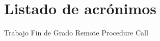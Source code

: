 \chapter{Listado de acrónimos}

\begin{acronym}[XXXXXXXX]
       {Trabajo Fin de Grado}
       {Remote Procedure Call}
\end{acronym}




